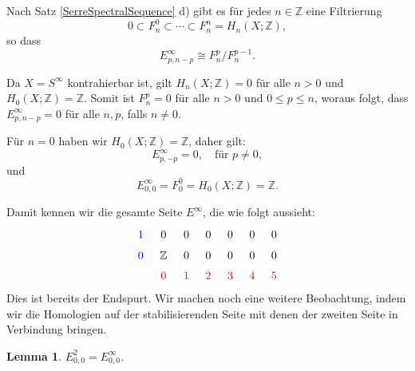 \documentclass[12pt]{article}
\numberwithin{conj}{section}
\newtheorem{lemma}[conj]{Lemma}
\begin{document}
    Nach Satz \ref{SerreSpectralSequence} d) gibt es für jedes
    $n \in \mathbb{Z}$ eine Filtrierung
    \[
        0 \subset F^{0}_{n} \subset \cdots \subset F^{n}_{n} = H_{n}(X;\mathbb{Z}),
    \]
    so dass
    \[
        E^{\infty}_{p,n-p}\cong F_{n}^{p} / F_{n}^{p-1}.
    \]

    Da $X = S^{\infty}$ kontrahierbar ist, gilt $H_{n}(X;\mathbb{Z}) = 0$ für alle
    $n > 0$ und $H_{0}(X;\mathbb{Z}) = \mathbb{Z}$. Somit ist $F_{n}^{p} = 0$ für alle
    $n > 0$ und $0 \leq p \leq n$, woraus folgt, dass $E^{\infty}_{p,n-p}= 0$ für alle
    $n,p$, falls $n \neq 0$.

    Für $n = 0$ haben wir $H_{0}(X;\mathbb{Z}) = \mathbb{Z}$, daher gilt:
    \[
        E^{\infty}_{p,-p}= 0, \quad \text{für }p \neq 0,
    \]
    und
    \[
        E^{\infty}_{0,0}= F_{0}^{0} = H_{0}(X;\mathbb{Z}) = \mathbb{Z}.
    \]

    Damit kennen wir die gesamte Seite $E^{\infty}$, die wie folgt aussieht:
    \[
        \begin{tikzcd}
            [sep=tiny] {\color{blue}1} & 0 & 0 & 0 & 0 & 0 & 0 \\ {\color{blue}0} & {\mathbb{Z}}
            & 0 & 0 & 0 & 0 & 0 \\ & {\color{red}0} & {\color{red}1} & {\color{red}2} &
            {\color{red}3} & {\color{red}4} & {\color{red}5}
        \end{tikzcd}
    \]
    Dies ist bereits der Endspurt. Wir machen noch eine weitere Beobachtung, indem
    wir die Homologien auf der stabilisierenden Seite mit denen der zweiten Seite in
    Verbindung bringen.
    \begin{lemma}
        $E^{2}_{0,0}= E^{\infty}_{0,0}$.
    \end{lemma}

    \newpage
    \nocite{*}
    \printbibliography
\end{document}
